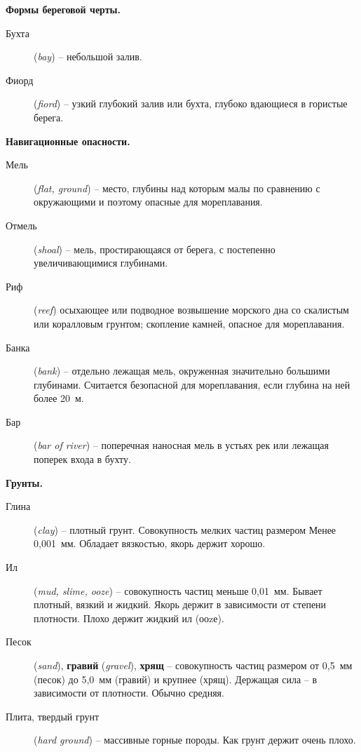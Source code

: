 \documentclass[a4paper, 12pt, twoside, final, book, russian, fittopage, cyremdash]{ncc}
\begin{document}
\textbf{Формы береговой черты.}

\begin{description}
\item [Бухта] (\textit{bay}) \--- небольшой залив. 
\item [Фиорд] (\textit{fiord}) \--- узкий глубокий залив или бухта, глубоко вдающиеся в гористые берега. 
\end{description}

\textbf{Навигационные опасности.}

\begin{description}
\item [Мель] (\textit{flat, ground}) \--- место, глубины над которым малы по сравнению с окружающими и поэтому опасные для мореплавания. 
\item [Отмель] (\textit{shoal}) \--- мель, простирающаяся от берега, с постепенно увеличивающимися глубинами. 
\item [Риф] (\textit{reef}) осыхающее или подводное возвышение морского дна со скалистым или коралловым грунтом; скопление камней, опасное для мореплавания. 
\item [Банка] (\textit{bank}) \--- отдельно лежащая мель, окруженная значительно большими глубинами. Считается безопасной для мореплавания, если глубина на ней более 20~м. 
\item [Бар] (\textit{bar of river}) \--- поперечная наносная мель в устьях рек или лежащая поперек входа в бухту. 
\end{description}

\textbf{Грунты.}

\begin{description}
\item [Глина] (\textit{clay}) \--- плотный грунт. Совокупность мелких частиц размером Менее 0,001~мм. Обладает вязкостью, якорь держит хорошо. 
\item [Ил] (\textit{mud, slime, ooze}) \--- совокупность частиц меньше 0,01~мм. Бывает плотный, вязкий и жидкий. Якорь держит в зависимости от степени плотности. Плохо держит жидкий ил (ооzе). 
\item [Песок] (\textit{sand}), \textbf{гравий} (\textit{gravel}), \textbf{хрящ} \--- совокупность частиц размером от 0,5~мм (песок) до 5,0~мм (гравий) и крупнее (хрящ). Держащая сила \--- в зависимости от плотности. Обычно средняя. 
\item [Плита, твердый грунт] (\textit{hard ground}) \--- массивные горные породы. Как грунт держит очень плохо. 
\end{description}
\end{document}
